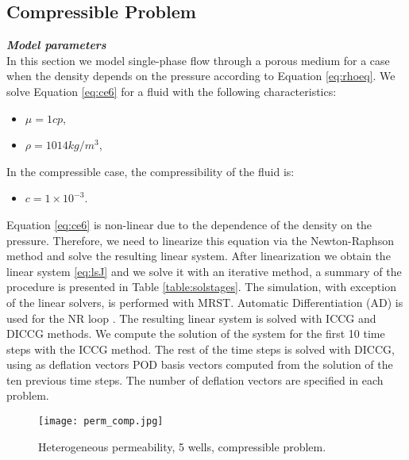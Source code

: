 \documentclass[12pt]{article}
\numberwithin{equation}{section}
\begin{document}
\newpage
\newpage
\subsection{Compressible Problem}
\emph{\textbf{Model parameters}}\\

In this section we model single-phase flow through a porous medium for a case when the density depends on the pressure according to Equation \ref{eq:rhoeq}. We solve Equation \eqref{eq:ce6} for a fluid with the following characteristics:
\begin{itemize}
 \item $\mu = 1 cp$,
 \item $\rho = 1014 kg/m^3$,
\end{itemize}
In the compressible case, the compressibility of the fluid is:
\begin{itemize}
 \item $c= 1 \times 10^{-3}$.
\end{itemize}
Equation \eqref{eq:ce6} is non-linear due to the dependence of the density on the pressure. Therefore, we need to linearize this equation via the Newton-Raphson method and solve the resulting linear system. After linearization we obtain the linear system \eqref{eq:lsJ} and we solve it with an iterative method, a summary of the procedure is presented in Table \ref{table:solstages}. The simulation, with exception of the linear solvers, is performed with MRST. Automatic Differentiation (AD) is used for the NR loop \cite{Lie13}. The resulting linear system is solved with ICCG and DICCG methods. We compute the solution of the system for the first 10 time steps with the ICCG method. The rest of the time steps is solved with DICCG, using as deflation vectors POD basis vectors computed from the solution of the ten previous time steps. The number of deflation vectors are specified in each problem. \\
\begin{wrapfigure}{R}{5cm}
\centering 
\vspace{-20pt}
\texttt{[image: perm\_comp.jpg]}
 \vspace{-15pt}
\caption{ Heterogeneous permeability, 5 wells, compressible problem.}\label{fig:pc}
\vspace{-10pt}
\end{wrapfigure} 
\end{document}
